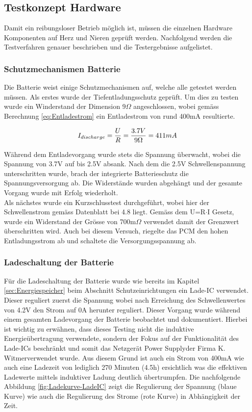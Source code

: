 \subsection{Testkonzept Hardware}\label{sec:testkonzeptHardware}
Damit ein reibungsloser Betrieb möglich ist, müssen die einzelnen Hardware Komponenten auf Herz und Nieren geprüft werden. Nachfolgend werden die Testverfahren genauer beschrieben und die Testergebnisse aufgelistet.

\subsubsection*{Schutzmechanismen Batterie}\label{sec:batterie}
Die Batterie weist einige Schutzmechanismen auf, welche alle getestet werden müssen. Als erstes wurde der Tiefentladungsschutz geprüft. Um dies zu testen wurde ein Winderstand der Dimension 9$\Omega$ angeschlossen, wobei gemäss Berechnung \ref{eq:Entladestrom} ein Entladestrom von rund 400mA resultierte.

\begin{equation}
\centering
I_{discharge}=\frac{U}{R}=\frac{3.7V}{9\Omega }= 411mA
\label{eq:Entladestrom}
\end{equation}

Während dem Entladevorgang wurde stets die Spannung überwacht, wobei die Spannung von 3.7V auf bis 2.5V absank. Nach dem die 2.5V Schwellenspannung unterschritten wurde, brach der integrierte Batterieschutz die Spannungsversorgung ab. Die Widerstände wurden abgehängt und der gesamte Vorgang wurde mit Erfolg wiederholt.
\\
Als nächstes wurde ein Kurzschlusstest durchgeführt, wobei hier der Schwellenstrom gemäss Datenblatt bei 4.8 liegt. Gemäss dem U=R$\cdot$I Gesetz, wurde ein Widerstand der Grösse von 700m$\Omega$ verwendet damit der Grenzwert überschritten wird. Auch bei diesem Versuch, riegelte das PCM den hohen Entladungsstrom ab und schaltete die Versorgungsspannung ab.

\subsubsection*{Ladeschaltung der Batterie}\label{sec:batterie}
Für die Ladeschaltung der Batterie wurde wie bereits im Kapitel \ref{sec:Energiespeicher} beim Abschnitt Schutzeinrichtungen ein Lade-IC verwendet. Dieser reguliert zuerst die Spannung wobei nach Erreichung des Schwellenwertes von 4.2V den Strom auf 0A herunter reguliert. Dieser Vorgang wurde während einem gesamten Ladevorgang der Batterie beobachtet und dokumentiert. Hierbei ist wichtig zu erwähnen, dass dieses Testing nicht die induktive Energieübertragung verwendete, sondern der Fokus auf der Funktionalität des Lade-ICs beschränkt und somit das Netzgerät \glqq Power Supply\grqq\space der Firma \glqq K. Witmer\grqq\space verwendet wurde. Aus diesem Grund ist auch ein Strom von 400mA wie auch eine Ladezeit von lediglich 270 Minuten (4.5h) ersichtlich was die effektiven Ladewerte mittels induktiver Ladung deutlich übertrumpfen. Die nachfolgende Abbildung \ref{fig:Ladekurve-LadeIC} zeigt die Regulierung der Spannung (blaue Kurve) wie auch die Regulierung des Strome (rote Kurve) in Abhängigkeit der Zeit.

